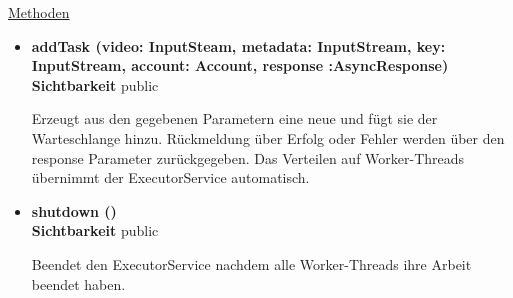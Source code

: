 \underline{Methoden}
\begin{itemize}
\itemsep0pt
\item \textbf{addTask (video: InputSteam, metadata: InputStream, 
key: InputStream, account: Account, response :AsyncResponse)}\hfill\\
\textbf{Sichtbarkeit} public

Erzeugt aus den gegebenen Parametern eine neue  und fügt sie der Warteschlange hinzu. Rückmeldung über Erfolg oder Fehler werden über den response Parameter zurückgegeben. Das Verteilen auf Worker-Threads übernimmt der ExecutorService automatisch.

\item \textbf{shutdown ()}\hfill\\
\textbf{Sichtbarkeit} public

Beendet den ExecutorService nachdem alle Worker-Threads ihre Arbeit beendet haben.

\end{itemize}